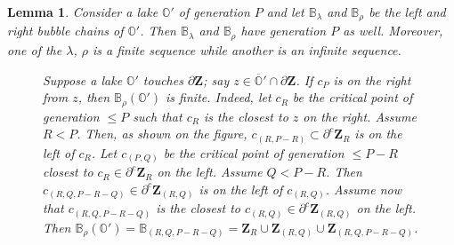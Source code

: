 \documentclass{amsart}
\newcommand{\1}{{\mathbb 1 }}
\newcommand{\bB}{{\mathbb{B}}}
\newcommand{\bO}{{\mathbb{O}}}
\newcommand{\bZ}{{\mathbf Z}}
\newtheorem{lem}[thm]{Lemma}
\theoremstyle{remark}
\numberwithin{equation}{section}
\theoremstyle{definition}
\theoremstyle{nonumberbreak}
\begin{document}
\begin{lem}
\label{lem:lakes lambda and rho}
Consider a lake $\bO'$ of generation $P$ and let $\bB_\lambda$ and $\bB_\rho$ be the left and right bubble chains of $\bO'$. Then $\bB_\lambda$ and $\bB_\rho$ have generation $P$ as well. Moreover, one of the $\lambda$, $\rho$ is a finite sequence while another is an infinite sequence.


\begin{figure}[tp!]
\caption{Suppose a lake $\bO'$ touches $\partial \bZ$; say $z\in \overline \bO'\cap \partial \bZ$. If $c_P$ is on the right from $z$, then $\bB_{\rho}(\bO')$ is finite. Indeed, let $c_R$ be the critical point of generation $\le P$ such that $c_R$ is the closest to $z$ on the right. Assume $R<P$. Then, as shown on the figure, $c_{(R,P-R)}\subset \partial ^c \bZ_R$ is on the left of $c_R$. Let $c_{(P,Q)}$ be the critical point of generation $\le P-R$ closest to $c_R\in  \partial^c \bZ_R$ on the left.  Assume $Q<P-R$. Then $c_{(R,Q,P-R-Q)}\in \partial ^c \bZ_{(R,Q)}$ is on the left of $c_{(R,Q)}$. Assume now that $c_{(R,Q,P-R-Q)}$ is the closest to $c_{(R,Q)}\in \partial^c \bZ_{(R,Q)}$ on the left. Then $\bB_\rho(\bO')=\bB_{(R,Q,P-R-Q)}=\bZ_R\cup \bZ_{(R,Q)}\cup \bZ_{(R,Q,P-R-Q)}$.} 
\label{Fig:finite bubble chain}
\end{figure}

 


\end{lem}
\end{document}
